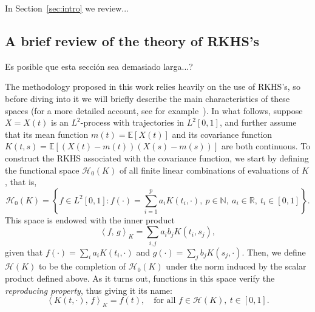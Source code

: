 \documentclass[ba]{imsart}
\numberwithin{equation}{section}
\theoremstyle{plain}
\newcommand{\N}{\mathbb{N}}
\newcommand{\R}{\mathbb{R}}
\newcommand\dotprod[2]{\left\langle #1,\, #2 \right\rangle}
\newenvironment{comment}
{
\noindent \em \color{red}
}
{
\color{black}
}
\begin{document}
In Section~\ref{sec:intro} we review...

\subsection{A brief review of the theory of RKHS's}\label{sec:rkhs}

\begin{comment}
  Es posible que esta sección sea demasiado larga...?
\end{comment}

The methodology proposed in this work relies heavily on the use of RKHS's, so before diving into it we will briefly describe the main characteristics of these spaces (for a more detailed account, see for example~\citet{berlinet2004reproducing}). In what follows, suppose \(X=X(t)\) is an \(L^2\)-process with trajectories in \(L^2[0,1]\), and further assume that its mean function \(m(t)=\mathbb E[X(t)]\) and its covariance function \(K(t, s)= \mathbb E[(X(t) - m(t))(X(s) - m(s))]\) are both continuous. To construct the RKHS associated with the covariance function, we start by defining the functional space \(\mathcal H_0(K)\) of all finite linear combinations of evaluations of \(K\), that is,
\[
\mathcal H_0(K) = \left\{ f \in L^2[0,1]: f(\cdot) = \sum_{i=1}^p a_i K(t_i, \cdot), \ p \in \N, \ a_i \in \R, \ t_i \in [0, 1] \right\}.
\]
This space is endowed with the inner product
\[
\dotprod{f}{g}_K = \sum_{i, j} a_i b_j K(t_i, s_j),
\]
given that \(f(\cdot)=\sum_i a_i K(t_i, \cdot) \) and \(g(\cdot)=\sum_j b_j K(s_j, \cdot)\). Then, we define \(\mathcal H(K)\) to be the completion of \(\mathcal H_0(K)\) under the norm induced by the scalar product defined above. As it turns out, functions in this space verify the \textit{reproducing property}, thus giving it its name:
\begin{equation}\label{eq:reproducing-property}
  \dotprod{K(t, \cdot)}{f}_K = f(t), \quad \text{for all } f \in \mathcal H(K), \ t \in [0, 1].
\end{equation}
\end{document}
